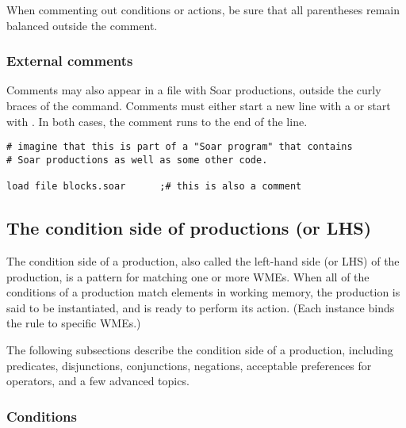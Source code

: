 When commenting out conditions or actions, be sure that all parentheses
remain balanced outside the comment.

\subsubsection*{External comments}

Comments may also appear in a file with Soar productions, outside
 the curly braces of the  command.  Comments
must either start a new line with a \soar{\#} or start with \soar{;\#}.
In both cases, the comment runs to the end of the line.

\begin{verbatim}
# imagine that this is part of a "Soar program" that contains 
# Soar productions as well as some other code.

load file blocks.soar      ;# this is also a comment
\end{verbatim}


\subsection{The condition side of productions (or LHS)}
\label{SYNTAX-pm-conditions}            %

The condition side of a production, also called the left-hand side (or
LHS) of the production, is a pattern for matching one or more WMEs. When
all of the conditions of a production match elements in working memory,
the production is said to be instantiated, and is ready to perform its
action. (Each instance binds the rule to specific WMEs.)

The following subsections describe the condition side of a production,
including predicates, disjunctions, conjunctions, negations, acceptable
preferences for operators, and a few advanced topics. 

\subsubsection{Conditions}
\label{Conditions}

